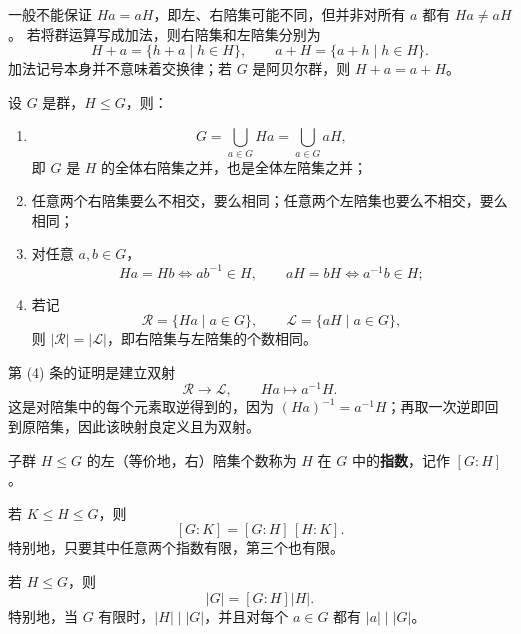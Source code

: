 \begin{purplenote}
一般不能保证 $Ha=aH$，即左、右陪集可能不同，但并非对所有 $a$ 都有 $Ha\neq aH$。
若将群运算写成加法，则右陪集和左陪集分别为
\[
  H+a=\{h+a\mid h\in H\},
  \qquad
  a+H=\{a+h\mid h\in H\}.
\]
加法记号本身并不意味着交换律；若 $G$ 是阿贝尔群，则 $H+a=a+H$。
\end{purplenote}

\begin{corollary}\label{cor:coset-partition}
设 $G$ 是群，$H\leq G$，则：
\begin{enumerate}[label=(\arabic*)]
  \item
  \[
    G=\bigcup_{a\in G}Ha=\bigcup_{a\in G}aH,
  \]
  即 $G$ 是 $H$ 的全体右陪集之并，也是全体左陪集之并；
  \item 任意两个右陪集要么不相交，要么相同；任意两个左陪集也要么不相交，要么相同；
  \item 对任意 $a,b\in G$，
  \[
    Ha=Hb\Longleftrightarrow ab^{-1}\in H,
    \qquad
    aH=bH\Longleftrightarrow a^{-1}b\in H;
  \]
  \item 若记
  \[
    \mathcal R=\{Ha\mid a\in G\},
    \qquad
    \mathcal L=\{aH\mid a\in G\},
  \]
  则 $|\mathcal R|=|\mathcal L|$，即右陪集与左陪集的个数相同。
\end{enumerate}
\end{corollary}

\begin{purplenote}
第 (4) 条的证明是建立双射
\[
  \mathcal R\longrightarrow\mathcal L,
  \qquad Ha\longmapsto a^{-1}H.
\]
这是对陪集中的每个元素取逆得到的，因为 $(Ha)^{-1}=a^{-1}H$；再取一次逆即回到原陪集，因此该映射良定义且为双射。
\end{purplenote}

\begin{definition}[指数]\label{def:subgroup-index}
子群 $H\leq G$ 的左（等价地，右）陪集个数称为 $H$ 在 $G$ 中的\textbf{指数}，记作 $[G:H]$。
\end{definition}

\begin{theorem}[指数的乘法公式]\label{thm:index-multiplication}
若 $K\leq H\leq G$，则
\[
  [G:K]=[G:H]\,[H:K].
\]
特别地，只要其中任意两个指数有限，第三个也有限。
\end{theorem}

\begin{corollary}[Lagrange 定理]\label{cor:lagrange}
若 $H\leq G$，则
\[
  |G|=[G:H]|H|.
\]
特别地，当 $G$ 有限时，$|H|\mid |G|$，并且对每个 $a\in G$ 都有 $|a|\mid|G|$。
\end{corollary}

